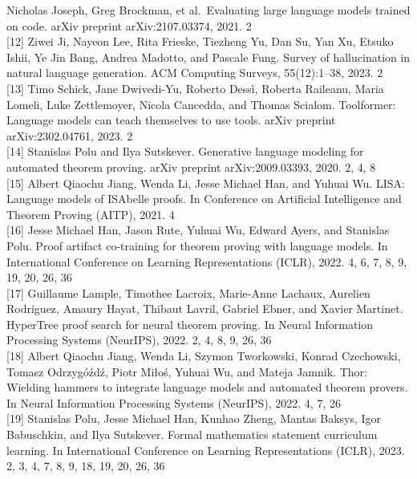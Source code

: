 \documentclass[
]{article}
\begin{document}
Nicholas Joseph, Greg Brockman, et al.~Evaluating large language models
trained on code. arXiv preprint arXiv:2107.03374, 2021. 2\\
{[}12{]} Ziwei Ji, Nayeon Lee, Rita Frieske, Tiezheng Yu, Dan Su, Yan
Xu, Etsuko Ishii, Ye Jin Bang, Andrea Madotto, and Pascale Fung. Survey
of hallucination in natural language generation. ACM Computing Surveys,
55(12):1--38, 2023. 2\\
{[}13{]} Timo Schick, Jane Dwivedi-Yu, Roberto Dessì, Roberta Raileanu,
Maria Lomeli, Luke Zettlemoyer, Nicola Cancedda, and Thomas Scialom.
Toolformer: Language models can teach themselves to use tools. arXiv
preprint arXiv:2302.04761, 2023. 2\\
{[}14{]} Stanislas Polu and Ilya Sutskever. Generative language modeling
for automated theorem proving. arXiv preprint arXiv:2009.03393, 2020. 2,
4, 8\\
{[}15{]} Albert Qiaochu Jiang, Wenda Li, Jesse Michael Han, and Yuhuai
Wu. LISA: Language models of ISAbelle proofs. In Conference on
Artificial Intelligence and Theorem Proving (AITP), 2021. 4\\
{[}16{]} Jesse Michael Han, Jason Rute, Yuhuai Wu, Edward Ayers, and
Stanislas Polu. Proof artifact co-training for theorem proving with
language models. In International Conference on Learning Representations
(ICLR), 2022. 4, 6, 7, 8, 9, 19, 20, 26, 36\\
{[}17{]} Guillaume Lample, Timothee Lacroix, Marie-Anne Lachaux,
Aurelien Rodriguez, Amaury Hayat, Thibaut Lavril, Gabriel Ebner, and
Xavier Martinet. HyperTree proof search for neural theorem proving. In
Neural Information Processing Systems (NeurIPS), 2022. 2, 4, 8, 9, 26,
36\\
{[}18{]} Albert Qiaochu Jiang, Wenda Li, Szymon Tworkowski, Konrad
Czechowski, Tomasz Odrzygóźdź, Piotr Miłoś, Yuhuai Wu, and Mateja
Jamnik. Thor: Wielding hammers to integrate language models and
automated theorem provers. In Neural Information Processing Systems
(NeurIPS), 2022. 4, 7, 26\\
{[}19{]} Stanislas Polu, Jesse Michael Han, Kunhao Zheng, Mantas Baksys,
Igor Babuschkin, and Ilya Sutskever. Formal mathematics statement
curriculum learning. In International Conference on Learning
Representations (ICLR), 2023. 2, 3, 4, 7, 8, 9, 18, 19, 20, 26, 36
\end{document}
